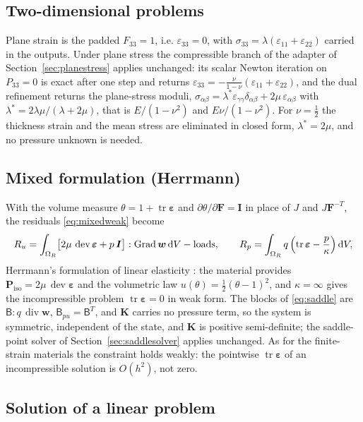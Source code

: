 \documentclass[11pt]{article}
\newcommand{\ud}{\,\mathrm{d}}
\newcommand{\Grad}{\operatorname{Grad}}
\newcommand{\dive}{\operatorname{div}}
\newcommand{\dev}{\operatorname{dev}}
\newcommand{\tr}{\operatorname{tr}}
\newcommand{\bw}{\bm{w}}
\newcommand{\beps}{\bm{\varepsilon}}
\newcommand{\bP}{\bm{P}}
\newcommand{\bF}{\bm{F}}
\newcommand{\bI}{\bm{I}}
\newcommand{\bK}{\bm{K}}
\newcommand{\bBm}{\bm{\mathsf{B}}}
\begin{document}
\subsection{Two-dimensional problems}

Plane strain is the padded $F_{33} = 1$, i.e. $\varepsilon_{33} = 0$, with
$\sigma_{33} = \lambda(\varepsilon_{11} + \varepsilon_{22})$ carried in the
outputs.  Under plane stress the compressible branch of the adapter of
Section~\ref{sec:planestress} applies unchanged: its scalar Newton iteration
on $P_{33} = 0$ is exact after one step and returns
$\varepsilon_{33} = -\tfrac{\nu}{1-\nu}(\varepsilon_{11} + \varepsilon_{22})$,
and the dual refinement returns the plane-stress moduli,
$\sigma_{\alpha\beta} = \lambda^*\varepsilon_{\gamma\gamma}\delta_{\alpha\beta} + 2\mu\,\varepsilon_{\alpha\beta}$
with $\lambda^* = 2\lambda\mu/(\lambda + 2\mu)$, that is $E/(1-\nu^2)$ and
$E\nu/(1-\nu^2)$.  For $\nu = \tfrac12$ the thickness strain and the mean
stress are eliminated in closed form, $\lambda^* = 2\mu$, and no pressure
unknown is needed.

\subsection{Mixed formulation (Herrmann)}

With the volume measure $\theta = 1 + \tr\beps$ and
$\partial\theta/\partial\bF = \bI$ in place of $J$ and $J\bF^{-T}$, the
residuals \eqref{eq:mixedweak} become
\begin{equation}
  R_u = \int_{\Omega_R}\bigl[2\mu\,\dev\beps + p\,\bI\bigr]:\Grad\bw\ud V - \text{loads}, \qquad
  R_p = \int_{\Omega_R} q\,\Bigl(\tr\beps - \frac{p}{\kappa}\Bigr)\ud V ,
  \label{eq:herrmann}
\end{equation}
Herrmann's formulation of linear elasticity \cite{herrmann}: the material provides
$\bP_{\mathrm{iso}} = 2\mu\,\dev\beps$ and the volumetric law
$u(\theta) = \tfrac12(\theta - 1)^2$, and $\kappa = \infty$ gives the
incompressible problem $\tr\beps = 0$ in weak form.  The blocks of
\eqref{eq:saddle} are $\bBm: q\,\dive\bw$, $\bBm_{pu} = \bBm^T$, and $\bK$
carries no pressure term, so the system is symmetric, independent of the
state, and $\bK$ is positive semi-definite; the saddle-point solver of
Section~\ref{sec:saddlesolver} applies unchanged.  As for the finite-strain
materials the constraint holds weakly: the pointwise $\tr\beps$ of an
incompressible solution is $O(h^2)$, not zero.

\subsection{Solution of a linear problem}
\label{sec:linearsolve}
\end{document}
